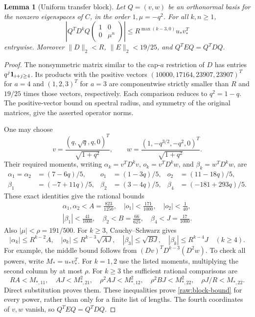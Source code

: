 \documentclass[11pt]{amsart}
\newtheorem{lemma}[theorem]{Lemma}
\theoremstyle{definition}
\theoremstyle{remark}
\numberwithin{equation}{section}
\begin{document}
\begin{lemma}[Uniform transfer block]\label{raw:block}
Let $Q=(v,w)$ be an orthonormal basis for the nonzero eigenspaces of
$C$, in the order $1,\mu=-q^2$.  For all $k,n\ge1$,
\begin{equation}\label{raw:block-bound}
 \left|Q^TD^kQ\begin{pmatrix}1&0\\0&\mu^n\end{pmatrix}\right|
 \le R^{\max(k-3,0)}u_*v_*^T
\end{equation}
entrywise.  Moreover $\|D\|_2<R$, $\|E\|_2<19/25$, and
$Q^TEQ=Q^TDQ$.
\end{lemma}
\begin{proof}
The nonsymmetric matrix similar to the cap-$a$ restriction of $D$ has
entries $q^j{\bf1}_{i+j\ge4}$.  Its products with the positive vectors
$(10000,17164,23907,23907)^T$ for $a=4$ and $(1,2,3)^T$ for $a=3$
are componentwise strictly smaller than $R$ and $19/25$ times those
vectors, respectively.  Each comparison reduces to $q^2=1-q$.
The positive-vector bound on spectral radius, and symmetry of the
original matrices, give the asserted operator norms.

One may choose
\[
 v=\frac{(q,\sqrt q,q,0)^T}{\sqrt{1+q^2}},\qquad
 w=\frac{(1,-q^{3/2},-q^2,0)^T}{\sqrt{1+q^2}}.
\]
Their required moments, writing
$\alpha_k=v^TD^kv$, $o_k=v^TD^kw$, and $\beta_k=w^TD^kw$, are
\begin{align*}
 \alpha_1=\alpha_2&=(7-6q)/5,&
 o_1&=(1-3q)/5,& o_2&=(11-18q)/5,\\
 \beta_1&=(-7+11q)/5,&
 \beta_2&=(3-4q)/5,& \beta_4&=(-181+293q)/5.
\end{align*}
These exact identities give the rational bounds
\[
 \begin{gathered}
 \alpha_1,\alpha_2<A=\frac{823}{1250},\quad
 |o_1|<\frac{171}{1000},\quad |o_2|<\frac1{40},\\
 |\beta_1|<\frac{41}{1000},\quad
 \beta_2<B=\frac{66}{625},\quad \beta_4<J=\frac{17}{1000}.
\end{gathered}
\]
Also $|\mu|<\rho=191/500$.  For $k\ge3$, Cauchy--Schwarz gives
\[
 |\alpha_k|\le R^{k-2}A,\quad
 |o_k|\le R^{k-3}\sqrt{AJ},\quad
 |\beta_3|\le\sqrt{BJ},\quad
 |\beta_k|\le R^{k-4}J\quad(k\ge4).
\]
For example, the middle bound follows from
$(Dv)^TD^{k-3}(D^2w)$.
To check all powers, write $M_*=u_*v_*^T$.  For $k=1,2$ use the
listed moments, multiplying the second column by at most $\rho$.
For $k\ge3$ the sufficient rational comparisons are
\[
 RA<M_{*,11},\quad AJ<M_{*,21}^2,\quad
 \rho^2AJ<M_{*,12}^2,\quad
 \rho^2BJ<M_{*,22}^2,\quad \rho J/R<M_{*,22}.
\]
Direct substitution proves them.  These inequalities prove
\eqref{raw:block-bound} for every power, rather than only for a finite
list of lengths.  The fourth coordinates of $v,w$ vanish, so
$Q^TEQ=Q^TDQ$.
\end{proof}
\end{document}
